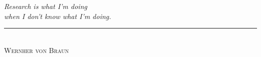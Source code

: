 \chapter*{~}


\begin{center}                      %
\vspace*{2.5in}                     %
\begin{onehalfspacing}
    \textit{
    Research is what I’m doing \\
    when I don’t know what I’m doing.
    } \\
    
    \rule{1.5in}{0.5pt} \\          %
    
    \textsc{Wernher von Braun}
\end{onehalfspacing}
\end{center}